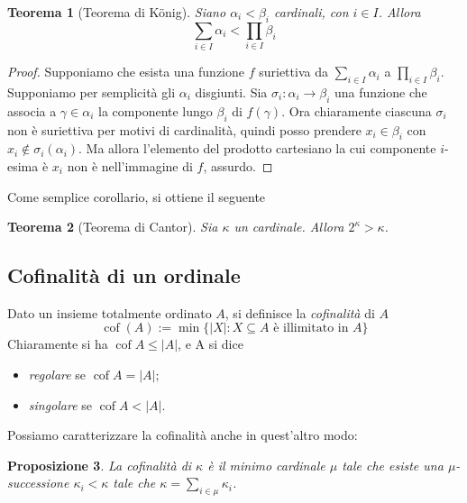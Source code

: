 \documentclass[a4paper,10pt,oneside]{article}
\DeclareMathOperator{\cof}{cof}
\newcommand{\myname}[1]{\emph{#1}}
\newcommand{\nin}{\not\in}
\theoremstyle{plain}
\newtheorem{mytheorem}{Teorema}[section]
\newtheorem{myprop}[mytheorem]{Proposizione}
\theoremstyle{definition}
\theoremstyle{remark}
\begin{document}
\begin{mytheorem}[Teorema di K\"onig]
  Siano $\alpha_i<\beta_i$ cardinali, con $i\in I$. Allora \[\sum_{i\in I} \alpha_i < \prod_{i\in I} \beta_i\]
\end{mytheorem}

\begin{proof} Supponiamo che esista una funzione $f$ suriettiva da $\sum_{i\in I} \alpha_i$ a $\prod_{i\in I} \beta_i$. Supponiamo per semplicità gli $\alpha_i$ disgiunti. Sia $\sigma_i: \alpha_i\rightarrow \beta_i$ una funzione che associa a $\gamma \in \alpha_i$ la componente lungo $\beta_i$ di $f (\gamma)$. Ora chiaramente ciascuna $\sigma_i$ non è suriettiva per motivi di cardinalità, quindi posso prendere $x_i \in \beta_i$ con $x_i \nin \sigma_i(\alpha_i)$. Ma allora l'elemento del prodotto cartesiano la cui componente $i$-esima è $x_i$ non è nell'immagine di $f$, assurdo.
\end{proof}
Come semplice corollario, si ottiene il seguente
\begin{mytheorem}[Teorema di Cantor]
 Sia $\kappa$ un cardinale. Allora $2^\kappa>\kappa$.
\end{mytheorem}


\subsection{Cofinalità di un ordinale}

Dato un insieme totalmente ordinato $A$, si definisce la \myname{cofinalità} di $A$
\[ \cof(A) := \min\{|X|:X\subseteq A \textrm{ è illimitato in }A\}\]  
Chiaramente si ha $\cof A \le |A|$, e A si dice
\begin{itemize}
 \item \myname{regolare} se $\cof A=|A|$;
 \item \myname{singolare} se $\cof A<|A|$.
\end{itemize}

Possiamo caratterizzare la cofinalità anche in quest'altro modo:
\begin{myprop}

 La cofinalità di $\kappa$ è il minimo cardinale $\mu$ tale che esiste una $\mu$-successione $\kappa_i<\kappa$ tale che $\kappa =\sum_{i\in \mu} \kappa_i$.
\end{myprop}
\end{document}
